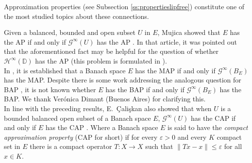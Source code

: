 \documentclass[12pt,leqno]{amsart}
\numberwithin{equation}{section} %
\theoremstyle{definition}
\numberwithin{equation}{section}
\begin{document}
Approximation properties (see Subsection \ref{ss:propertieslipfree}) constitute one of the most studied topics about these connections. 

Given a balanced, bounded and open subset $U$ in $E$, Mujica showed that $E$ has the AP if and only if $\mathcal{G}^\infty(U)$ has the AP \cite[Theorem 5.4]{Mujica91}. In that article, it was pointed out that the aforementioned fact may be helpful for the question of whether $\mathcal{H}^\infty(\mathbb{D})$ has the AP (this problem is formulated in \cite[Problem 1.e.10]{LT1}). \\


 
 In \cite[Proposition 5.7]{Mujica91}, it is established that a Banach space $E$ has the MAP if and only if $\mathcal{G}^\infty(B_E)$ has the MAP. Despite there is some work addressing the analogous question for BAP \cite{Caliskan2}, it is not known whether $E$ has the BAP if and only if $\mathcal{G}^\infty(B_E)$ has the BAP. We thank Ver\'onica Dimant (Buenos Aires) for clarifying this.\\
 


In line with the preceding results, E.~\c{C}ali\c{s}kan also showed that when $U$ is a bounded balanced open subset of a Banach space $E$, $\mathcal{G}^\infty(U)$ has the CAP if and only if $E$ has the CAP \cite{Caliskan0}. Where a Banach space $E$ is said to have the \textit{compact approximation property} (CAP for short) if for every $\varepsilon>0$ and every $K$ compact set in $E$ there is a compact operator $T:X\to X$ such that $\|Tx-x\|\leq \varepsilon$ for all $x\in K$. \\
\end{document}
